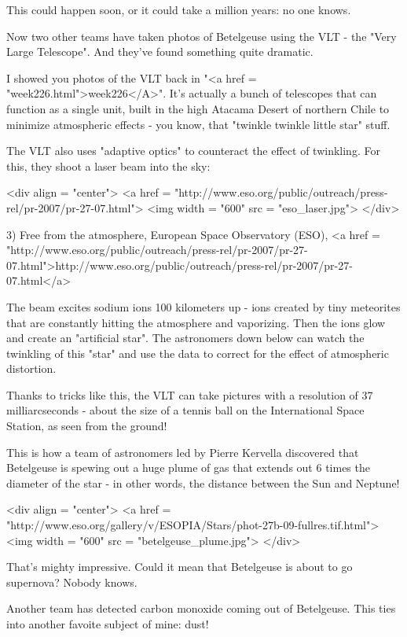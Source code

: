 This could happen soon, or it could take a million years: no one knows.

Now two other teams have taken photos of Betelgeuse using the VLT -
the "Very Large Telescope".  And they've found something quite
dramatic.

I showed you photos of the VLT back in "<a href =
"week226.html">week226</A>".  It's actually a bunch of telescopes
that can function as a single unit, built in the high Atacama Desert
of northern Chile to minimize atmospheric effects - you know, that
"twinkle twinkle little star" stuff.

The VLT also uses "adaptive optics" to counteract the effect of
twinkling.  For this, they shoot a laser beam into the sky:

<div align = "center">
<a href = "http://www.eso.org/public/outreach/press-rel/pr-2007/pr-27-07.html">
<img width = "600" src = "eso_laser.jpg">
</div>

3) Free from the atmosphere, European Space Observatory (ESO),
<a href = "http://www.eso.org/public/outreach/press-rel/pr-2007/pr-27-07.html">http://www.eso.org/public/outreach/press-rel/pr-2007/pr-27-07.html</a>

The beam excites sodium ions 100 kilometers up - ions created by tiny
meteorites that are constantly hitting the atmosphere and vaporizing.
Then the ions glow and create an "artificial star".  The astronomers
down below can watch the twinkling of this "star" and use the data to
correct for the effect of atmospheric distortion.

Thanks to tricks like this, the VLT can take pictures with a
resolution of 37 milliarcseconds - about the size of a tennis ball 
on the International Space Station, as seen from the ground!

This is how a team of astronomers led by Pierre Kervella discovered
that Betelgeuse is spewing out a huge plume of gas that extends out 6
times the diameter of the star - in other words, the distance between
the Sun and Neptune!  

<div align = "center">
<a href = "http://www.eso.org/gallery/v/ESOPIA/Stars/phot-27b-09-fullres.tif.html">
<img width = "600" src = "betelgeuse_plume.jpg">
</div>

That's mighty impressive.  Could it mean that 
Betelgeuse is about to go supernova?  Nobody knows.

Another team has detected carbon monoxide coming out of Betelgeuse.  
This ties into another favoite subject of mine: dust!

